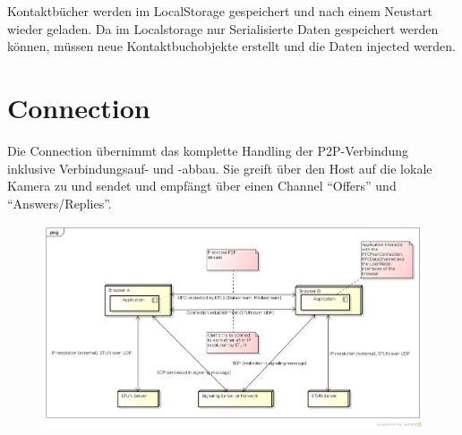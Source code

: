 	Kontaktbücher werden im LocalStorage gespeichert und nach einem Neustart wieder geladen. Da im Localstorage nur Serialisierte Daten gespeichert werden können, müssen neue Kontaktbuchobjekte erstellt und die Daten injected werden.


\section{Connection}
	Die Connection übernimmt das komplette Handling der P2P-Verbindung inklusive Verbindungsauf- und -abbau. Sie greift über den Host auf die lokale Kamera zu und sendet und empfängt über einen Channel "`Offers"' und "`Answers/Replies"'.
	\begin{figure}[H]
		\centering
		\includegraphics[width=\textwidth]{../architekturanalayse/img/connection.png}
	\end{figure}
		
